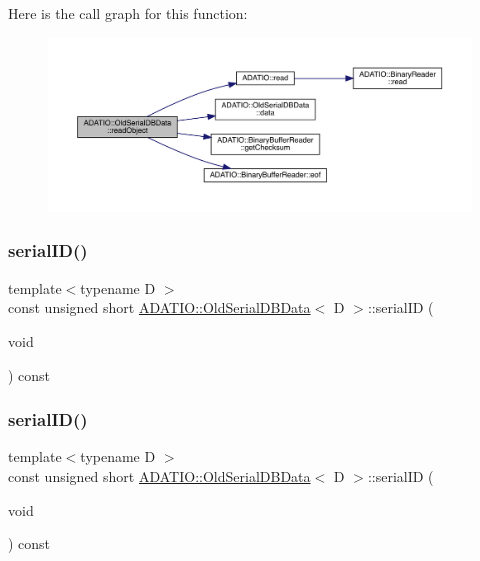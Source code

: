 Here is the call graph for this function\+:
\nopagebreak
\begin{figure}[H]
\begin{center}
\leavevmode
\includegraphics[width=350pt]{da/dbc/classADATIO_1_1OldSerialDBData_aad0338cd19224fe3eb6223afe7e2c2c4_cgraph}
\end{center}
\end{figure}
\mbox{\label{classADATIO_1_1OldSerialDBData_a379c8edee426f2a5ce3f41d0c46777de}} 
\subsubsection{\texorpdfstring{serialID()}{serialID()}\hspace{0.1cm}{\footnotesize\ttfamily [1/2]}}
{\footnotesize\ttfamily template$<$typename D $>$ \\
const unsigned short \mbox{\hyperlink{classADATIO_1_1OldSerialDBData}{A\+D\+A\+T\+I\+O\+::\+Old\+Serial\+D\+B\+Data}}$<$ D $>$\+::serial\+ID (\begin{DoxyParamCaption}\item[{void}]{ }\end{DoxyParamCaption}) const\hspace{0.3cm}{\ttfamily [inline]}}

\mbox{\label{classADATIO_1_1OldSerialDBData_a379c8edee426f2a5ce3f41d0c46777de}} 
\subsubsection{\texorpdfstring{serialID()}{serialID()}\hspace{0.1cm}{\footnotesize\ttfamily [2/2]}}
{\footnotesize\ttfamily template$<$typename D $>$ \\
const unsigned short \mbox{\hyperlink{classADATIO_1_1OldSerialDBData}{A\+D\+A\+T\+I\+O\+::\+Old\+Serial\+D\+B\+Data}}$<$ D $>$\+::serial\+ID (\begin{DoxyParamCaption}\item[{void}]{ }\end{DoxyParamCaption}) const\hspace{0.3cm}{\ttfamily [inline]}}

